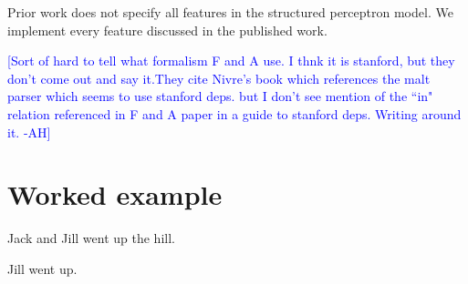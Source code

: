 \documentclass[11pt,a4paper]{article}
\newcommand{\ahcomment}[1]{\textcolor{blue}{[#1 -AH]}}
\begin{document}
Prior work does not specify all features in the structured perceptron model. We implement every feature discussed in the published work.

\ahcomment{Sort of hard to tell what formalism F and A use. I thnk it is stanford, but they don't come out and say it.They cite Nivre's book which references the malt parser which seems to use stanford deps. but I don't see mention of the ``in" relation referenced in F and A paper in a guide to stanford deps. Writing around it.}


\section{Worked example}

Jack and Jill went up the hill. 

Jill went up.



\end{document}

